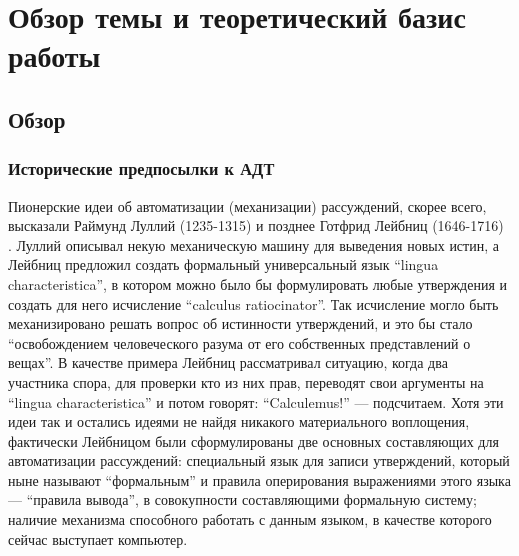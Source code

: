\chapter{Обзор темы и теоретический базис работы}
\label{basis}

\section{Обзор} 


\subsection{Исторические предпосылки к АДТ}
Пионерские идеи об автоматизации (механизации) рассуждений, скорее всего, высказали Раймунд Луллий (1235-1315) и позднее Готфрид Лейбниц (1646-1716) \cite{LogicComp}. Луллий описывал некую механическую машину для выведения новых истин, а Лейбниц предложил создать формальный универсальный язык ``lingua characteristica'', в котором можно было бы формулировать любые утверждения и создать для него исчисление ``calculus ratiocinator''. Так исчисление могло быть механизировано решать вопрос об истинности утверждений, и это бы стало ``освобождением человеческого разума от его собственных представлений о вещах''. В качестве примера Лейбниц рассматривал ситуацию, когда два участника спора, для проверки кто из них прав, переводят свои аргументы на ``lingua characteristica'' и потом говорят: ``Calculemus!'' --- подсчитаем. Хотя эти идеи так и остались идеями не найдя никакого материального воплощения, фактически Лейбницом были сформулированы две основных составляющих для автоматизации рассуждений: специальный язык для записи утверждений, который ныне называют ``формальным'' и правила оперирования выражениями этого языка --- ``правила вывода'', в совокупности составляющими формальную систему; наличие механизма способного работать с данным языком, в качестве которого сейчас выступает компьютер.

